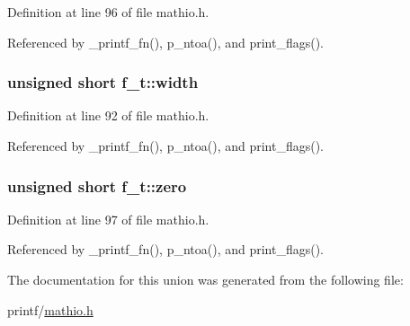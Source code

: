 Definition at line 96 of file mathio.\+h.



Referenced by \+\_\+printf\+\_\+fn(), p\+\_\+ntoa(), and print\+\_\+flags().

\subsubsection[{\texorpdfstring{width}{width}}]{\setlength{\rightskip}{0pt plus 5cm}unsigned short f\+\_\+t\+::width}\hypertarget{unionf__t_ad6b1584314c27653690552e95e1ed96f}{}\label{unionf__t_ad6b1584314c27653690552e95e1ed96f}


Definition at line 92 of file mathio.\+h.



Referenced by \+\_\+printf\+\_\+fn(), p\+\_\+ntoa(), and print\+\_\+flags().

\subsubsection[{\texorpdfstring{zero}{zero}}]{\setlength{\rightskip}{0pt plus 5cm}unsigned short f\+\_\+t\+::zero}\hypertarget{unionf__t_ac70397e87721255908299c190f3e5670}{}\label{unionf__t_ac70397e87721255908299c190f3e5670}


Definition at line 97 of file mathio.\+h.



Referenced by \+\_\+printf\+\_\+fn(), p\+\_\+ntoa(), and print\+\_\+flags().



The documentation for this union was generated from the following file\+:\begin{DoxyCompactItemize}
\item 
printf/\hyperlink{mathio_8h}{mathio.\+h}\end{DoxyCompactItemize}
